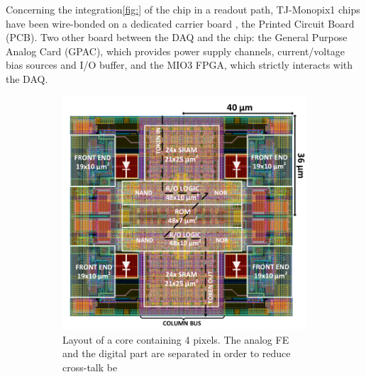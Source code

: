 Concerning the integration\ref{fig:} of the chip in a readout path, TJ-Monopix1 chips have been wire-bonded on a dedicated carrier board , the Printed Circuit Board (PCB). Two other board between the DAQ and the chip: the General Purpose Analog Card (GPAC), which provides power supply channels, current/voltage bias sources and I/O buffer, and the MIO3 FPGA, which strictly interacts with the DAQ.
\begin{figure}[h!]
    \begin{subfigure}{.5\textwidth}
    \centering
    \includegraphics[width=.98\linewidth]{figures/Monopix1/Monopix1_2x2pixelsgroup.png}
    \caption{Layout of a core containing 4 pixels. The analog FE and the digital part are separated in order to reduce cross-talk be}
    \label{fig:pixels_core}
    \end{subfigure}
    \begin{subfigure}{.5\textwidth}
    \centering

\end{subfigure}
\end{figure}
